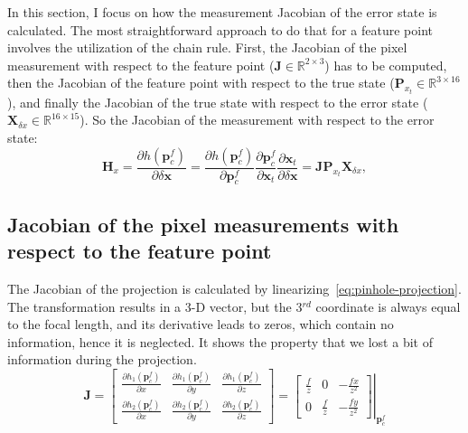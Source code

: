 In this section, I focus on how the measurement Jacobian of the error state is calculated. The most straightforward approach to do that for a feature point involves the utilization of the chain rule. First, the Jacobian of the pixel measurement with respect to the feature point ($\mathbf{J}\in\mathbb{R}^{2\times3}$) has to be computed, then the Jacobian of the feature point with respect to the true state ($\mathbf{P}_{x_t}\in\mathbb{R}^{3\times 16}$), and finally the Jacobian of the true state with respect to the error state ($\mathbf{X}_{\delta x}\in\mathbb{R}^{16\times 15}$). So the Jacobian of the measurement with respect to the error state:
\begin{equation}
    \mathbf{H}_x=\frac{\partial h(\mathbf{p}_c^f)}{\partial\delta\mathbf{x}}= 
    \frac{\partial h(\mathbf{p}_c^f)}{\partial\mathbf{p}_c^f}
    \frac{\partial\mathbf{p}_c^f}{\partial\mathbf{x}_t}
    \frac{\partial\mathbf{x}_t}{\partial\delta\mathbf{x}} =\mathbf{J}\mathbf{P}_{x_t}\mathbf{X}_{\delta x},
\end{equation} 

\subsection*{Jacobian of the pixel measurements with respect to the feature point}

The Jacobian of the projection is calculated by linearizing~\eqref{eq:pinhole-projection}. The transformation results in a 3-D vector, but the 3$^{rd}$ coordinate is always equal to the focal length, and its derivative leads to zeros, which contain no information, hence it is neglected. It shows the property that we lost a bit of information during the projection.
\begin{equation}
    \mathbf{J}=\begin{bmatrix}
        \frac{\partial h_1(\mathbf{p}_c^f)}{\partial x} & \frac{\partial h_1(\mathbf{p}_c^f)}{\partial y} & \frac{\partial h_1(\mathbf{p}_c^f)}{\partial z} \\
        \frac{\partial h_2(\mathbf{p}_c^f)}{\partial x} & \frac{\partial h_2(\mathbf{p}_c^f)}{\partial y} & \frac{\partial h_2(\mathbf{p}_c^f)}{\partial z}
    \end{bmatrix} = \left.\begin{bmatrix}
        \frac{f}{z} & 0 & -\frac{fx}{z^2} \\
        0 & \frac{f}{z} & -\frac{fy}{z^2}
    \end{bmatrix}\right\vert_{\mathbf{p}_c^f}
    \label{eq:p-der-by-xt}
\end{equation}

